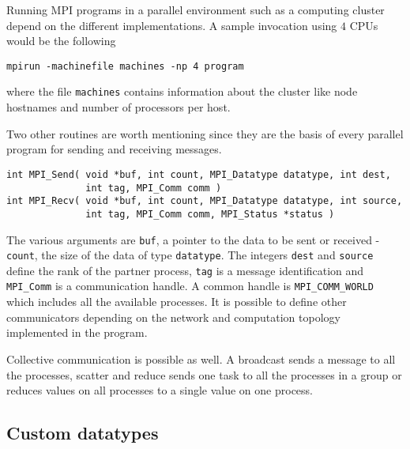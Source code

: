 \documentclass{article}
\begin{document}
Running MPI programs in a parallel environment such as
a computing cluster depend on the different implementations.
A sample invocation using $4$ CPUs would be the following

\begin{verbatim}
mpirun -machinefile machines -np 4 program
\end{verbatim}

where the file \verb+machines+ contains information about
the cluster like node hostnames and number of processors per
host.

Two other routines are worth mentioning since they are
the basis of every parallel program for sending and
receiving messages.

\begin{verbatim}
int MPI_Send( void *buf, int count, MPI_Datatype datatype, int dest, 
              int tag, MPI_Comm comm )
int MPI_Recv( void *buf, int count, MPI_Datatype datatype, int source, 
              int tag, MPI_Comm comm, MPI_Status *status )
\end{verbatim}

The various arguments are \verb+buf+, a pointer to the data to be
sent or received - \verb+count+, the size of the data of type
\verb+datatype+. The integers \verb+dest+ and \verb+source+ define
the rank of the partner process, \verb+tag+ is a message identification
and \verb+MPI_Comm+ is a communication handle. A common handle is
\verb+MPI_COMM_WORLD+ which includes all the available processes.
It is possible to define other communicators depending on the
network and computation topology implemented in the program.

Collective communication is possible as well. A broadcast sends
a message to all the processes, scatter and reduce sends one task
to all the processes in a group or reduces values on all processes to a
single value on one process.

\subsection{Custom datatypes}
\end{document}
